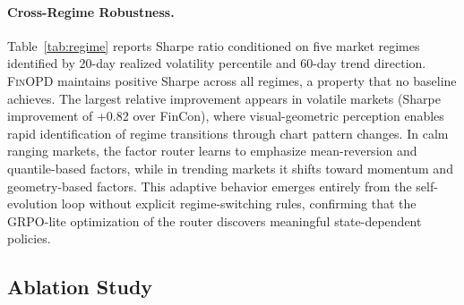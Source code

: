 \paragraph{Cross-Regime Robustness.} Table~\ref{tab:regime} reports Sharpe ratio conditioned on five market regimes identified by 20-day realized volatility percentile and 60-day trend direction. \textsc{FinOPD} maintains positive Sharpe across all regimes, a property that no baseline achieves. The largest relative improvement appears in volatile markets (Sharpe improvement of +0.82 over FinCon), where visual-geometric perception enables rapid identification of regime transitions through chart pattern changes. In calm ranging markets, the factor router learns to emphasize mean-reversion and quantile-based factors, while in trending markets it shifts toward momentum and geometry-based factors. This adaptive behavior emerges entirely from the self-evolution loop without explicit regime-switching rules, confirming that the GRPO-lite optimization of the router discovers meaningful state-dependent policies.

\subsection{Ablation Study}



